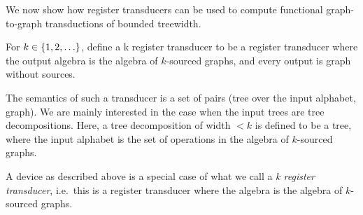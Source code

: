  We now show how register transducers can be used to compute functional graph-to-graph \mso transductions of bounded treewidth.


\begin{definition}
    For $k \in \{1,2,\ldots\}$, define a \treetotreewidth k register transducer to be a register transducer where the output algebra is the algebra of $k$-sourced graphs, and every output is graph without sources.
\end{definition}

The semantics of such a transducer is a set of pairs (tree over the input alphabet, graph). We are mainly interested in the case when the input trees are tree decompositions. Here, a tree decomposition of width $<k$ is defined to be a tree, where the input alphabet is the set of operations in the algebra of $k$-sourced graphs. 


A device as described above is a special case of what we call a \emph{\treetotreewidth k register transducer}, i.e.~this is a register transducer where  the algebra is the algebra of $k$-sourced graphs.  

